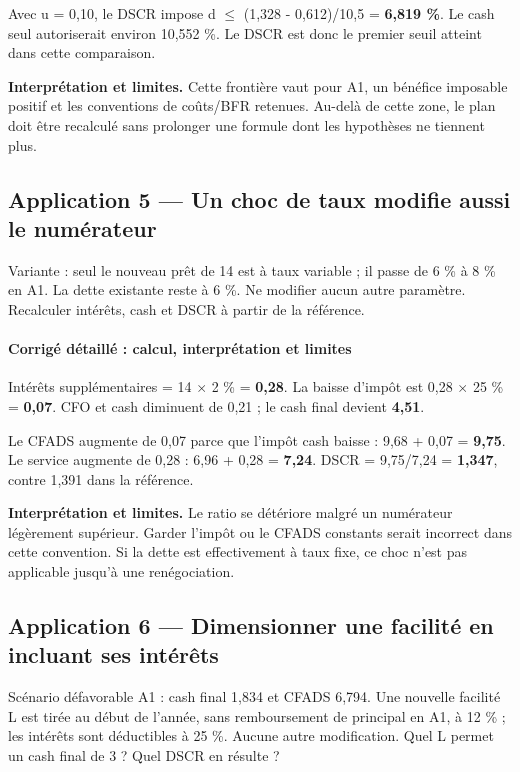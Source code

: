 \documentclass[12pt,a4paper]{article}
\begin{document}
Avec u = 0,10, le DSCR impose d $\leq$ (1,328 - 0,612)/10,5 = \textbf{6,819 \%}. Le cash seul autoriserait environ 10,552 \%. Le DSCR est donc le premier seuil atteint dans cette comparaison.

\textbf{Interprétation et limites.} Cette frontière vaut pour A1, un bénéfice imposable positif et les conventions de coûts/BFR retenues. Au-delà de cette zone, le plan doit être recalculé sans prolonger une formule dont les hypothèses ne tiennent plus.


\subsection*{Application 5 --- Un choc de taux modifie aussi le numérateur}
Variante : seul le nouveau prêt de 14 est à taux variable ; il passe de 6 \% à 8 \% en A1. La dette existante reste à 6 \%. Ne modifier aucun autre paramètre. Recalculer intérêts, cash et DSCR à partir de la référence.


\paragraph{Corrigé détaillé : calcul, interprétation et limites}
Intérêts supplémentaires = 14 $\times$ 2 \% = \textbf{0,28}. La baisse d’impôt est 0,28 $\times$ 25 \% = \textbf{0,07}. CFO et cash diminuent de 0,21 ; le cash final devient \textbf{4,51}.

Le CFADS augmente de 0,07 parce que l’impôt cash baisse : 9,68 + 0,07 = \textbf{9,75}. Le service augmente de 0,28 : 6,96 + 0,28 = \textbf{7,24}. DSCR = 9,75/7,24 = \textbf{1,347}, contre 1,391 dans la référence.

\textbf{Interprétation et limites.} Le ratio se détériore malgré un numérateur légèrement supérieur. Garder l’impôt ou le CFADS constants serait incorrect dans cette convention. Si la dette est effectivement à taux fixe, ce choc n’est pas applicable jusqu’à une renégociation.


\subsection*{Application 6 --- Dimensionner une facilité en incluant ses intérêts}
Scénario défavorable A1 : cash final 1,834 et CFADS 6,794. Une nouvelle facilité L est tirée au début de l’année, sans remboursement de principal en A1, à 12 \% ; les intérêts sont déductibles à 25 \%. Aucune autre modification. Quel L permet un cash final de 3 ? Quel DSCR en résulte ?
\end{document}
